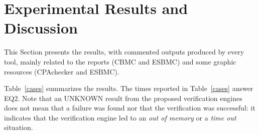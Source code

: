 
\section{Experimental Results and Discussion}
\label{sec:results_indeed}

This Section presents the results, with commented outputs produced by every tool, mainly related to the reports (CBMC and ESBMC) and some graphic resources (CPAchecker and ESBMC).

%
Table~\ref{cases} summarizes the results. The times reported in Table~\ref{cases} answer EQ2. 
Note that an UNKNOWN result from the proposed verification engines does not mean that a failure was found nor that the verification was successful: it indicates that the verification engine led to an \textit{out of memory} or a \textit{time out} situation.

